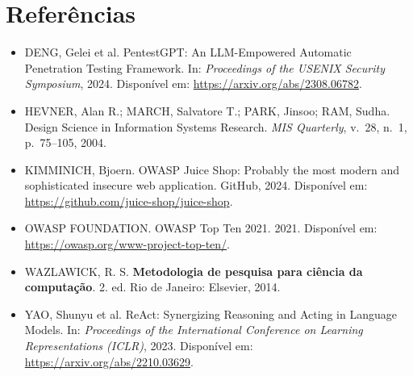 \documentclass[12pt, a4paper]{article}
\begin{document}
\section{Referências}

\begin{itemize}

  \item DENG, Gelei et al. PentestGPT: An LLM-Empowered Automatic Penetration Testing Framework. In: \textit{Proceedings of the USENIX Security Symposium}, 2024. Disponível em: \url{https://arxiv.org/abs/2308.06782}.

  \item HEVNER, Alan R.; MARCH, Salvatore T.; PARK, Jinsoo; RAM, Sudha. Design Science in Information Systems Research. \textit{MIS Quarterly}, v.~28, n.~1, p.~75--105, 2004.

  \item KIMMINICH, Bjoern. OWASP Juice Shop: Probably the most modern and sophisticated insecure web application. GitHub, 2024. Disponível em: \url{https://github.com/juice-shop/juice-shop}.

  \item OWASP FOUNDATION. OWASP Top Ten 2021. 2021. Disponível em: \url{https://owasp.org/www-project-top-ten/}.

  \item WAZLAWICK, R. S. \textbf{Metodologia de pesquisa para ciência da computação}. 2. ed. Rio de Janeiro: Elsevier, 2014.

  \item YAO, Shunyu et al. ReAct: Synergizing Reasoning and Acting in Language Models. In: \textit{Proceedings of the International Conference on Learning Representations (ICLR)}, 2023. Disponível em: \url{https://arxiv.org/abs/2210.03629}.

\end{itemize}
\end{document}
